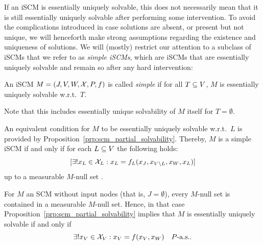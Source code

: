 If an iSCM is essentially uniquely solvable, this does not necessarily mean that it is still essentially uniquely solvable after performing some intervention. 
To avoid the complications introduced in case solutions are absent, or present but not unique, we will henceforth make strong assumptions regarding the existence and uniqueness of solutions. 
We will (mostly) restrict our attention to a subclass of iSCMs that we refer to as \emph{simple iSCMs}, which are iSCMs that are essentially uniquely solvable and remain so after any hard intervention:
\begin{Def}\label{def:simple_scm}
  An iSCM $M = \left ( J, V, W, \mathcal{X}, P, f \right )$ is called \emph{simple} if for all $T \subseteq V$, $M$ is essentially uniquely solvable w.r.t.\ $T$.
\end{Def}
Note that this includes essentially unique solvability of $M$ itself for $T = \emptyset$.

\begin{Rem}\label{rem:scm_simple_sufficient_condition}
An equivalent condition for $M$ to be essentially uniquely solvable w.r.t.\ $L$ is provided by Proposition~\ref{prp:scm_partial_solvability}.
Thereby, $M$ is a simple iSCM if and only if for each $L \subseteq V$ the following holds:
$$[\exists! x_L \in \mathcal{X}_L : x_L = f_L(x_J,x_{V\setminus L},x_W,x_L)]$$
up to a measurable $M$-null set \TODOmas.

For $M$ an SCM without input nodes (that is, $J = \emptyset$), every $M$-null set is contained in a measurable $M$-null set.
Hence, in that case Proposition~\ref{prp:scm_partial_solvability} implies that $M$ is essentially uniquely solvable if and only if
$$\exists! x_V \in \mathcal{X}_V : x_V = f(x_V,x_W)\quad P\text{-a.s.}.$$
\end{Rem}
%

